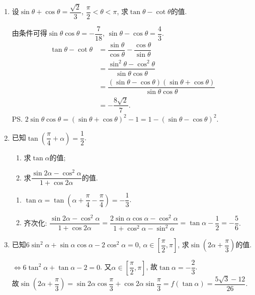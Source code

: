 \begin{enumerate}
    \item 设$\sin\theta+\cos\theta=\dfrac{\sqrt{2}}{3}$, $\dfrac{\pi}{2}<\theta<\pi$, 求$\tan\theta-\cot\theta$的值. 
    \begin{jieda}
    由条件可得$\sin\theta\cos\theta=-\dfrac{7}{18}$, $\sin\theta-\cos\theta=\dfrac{4}{3}$. 
    \begin{align*}
    \tan\theta-\cot\theta & = \dfrac{\sin\theta}{\cos\theta}-\dfrac{\cos\theta}{\sin\theta}\\
    & = \dfrac{\sin^2\theta-\cos^2\theta}{\sin\theta\cos\theta}\\
    & = \dfrac{(\sin\theta-\cos\theta)(\sin\theta+\cos\theta)}{\sin\theta\cos\theta}\\
    & = -\dfrac{8\sqrt{2}}{7}. 
    \end{align*}
    \ps $2\sin\theta\cos\theta=(\sin\theta+\cos\theta)^2-1=1-(\sin\theta-\cos\theta)^2$. 
    \end{jieda}
    
    
    \item 已知$\tan\left(\dfrac{\pi}{4}+\alpha\right)=\dfrac{1}{2}$. 
    \begin{enumerate}[(1)]
    \item 求$\tan\alpha$的值; 
    \item 求$\dfrac{\sin2\alpha-\cos^2\alpha}{1+\cos2\alpha}$的值. 
    \end{enumerate}
    \begin{jieda}
    \begin{enumerate}[(1)]
    \item $\tan\alpha=\tan\left(\alpha+\dfrac{\pi}{4}-\dfrac{\pi}{4}\right)=-\dfrac{1}{3}$. 
    
    \item 齐次化: $\dfrac{\sin2\alpha-\cos^2\alpha}{1+\cos2\alpha}=\dfrac{2\sin\alpha\cos\alpha-\cos^2\alpha}{1+\cos^2\alpha-\sin^2\alpha}=\tan\alpha-\dfrac{1}{2}=-\dfrac{5}{6}$. 
    \end{enumerate}
    \end{jieda}
    
    
    \item 已知$6\sin^2\alpha+\sin\alpha\cos\alpha-2\cos^2\alpha=0$, $\alpha\in\left[\dfrac{\pi}{2},\pi\right]$, 求$\sin\left(2\alpha+\dfrac{\pi}{3}\right)$的值. 
    \begin{jieda}
    $\iff 6\tan^2\alpha+\tan\alpha-2=0$. 又$\alpha\in\left[\dfrac{\pi}{2},\pi\right]$, 故$\tan\alpha=-\dfrac{2}{3}$. \\
    故$\sin\left(2\alpha+\dfrac{\pi}{3}\right)=\sin2\alpha\cos\dfrac{\pi}{3}+\cos2\alpha\sin\dfrac{\pi}{3}=f(\tan\alpha)=\dfrac{5\sqrt{3}-12}{26}$. 
    \end{jieda}
    
\end{enumerate}
